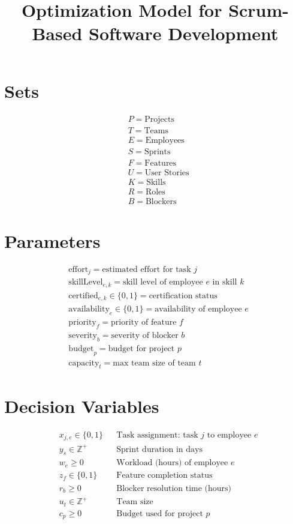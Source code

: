 \documentclass{article}
\begin{document}
\title{Optimization Model for Scrum-Based Software Development}
\author{}
\date{}
\maketitle

\section*{Sets}
\begin{align*}
& P = \text{Projects} \\
& T = \text{Teams} \\
& E = \text{Employees} \\
& S = \text{Sprints} \\
& F = \text{Features} \\
& U = \text{User Stories} \\
& K = \text{Skills} \\
& R = \text{Roles} \\
& B = \text{Blockers}
\end{align*}

\section*{Parameters}
\begin{align*}
& \text{effort}_j = \text{estimated effort for task } j \\
& \text{skillLevel}_{e,k} = \text{skill level of employee } e \text{ in skill } k \\
& \text{certified}_{e,k} \in \{0,1\} = \text{certification status} \\
& \text{availability}_e \in \{0,1\} = \text{availability of employee } e \\
& \text{priority}_f = \text{priority of feature } f \\
& \text{severity}_b = \text{severity of blocker } b \\
& \text{budget}_p = \text{budget for project } p \\
& \text{capacity}_t = \text{max team size of team } t
\end{align*}

\section*{Decision Variables}
\begin{align*}
& x_{j,e} \in \{0,1\} && \text{Task assignment: task } j \text{ to employee } e \\
& y_s \in \mathbb{Z}^+ && \text{Sprint duration in days} \\
& w_e \geq 0 && \text{Workload (hours) of employee } e \\
& z_f \in \{0,1\} && \text{Feature completion status} \\
& r_b \geq 0 && \text{Blocker resolution time (hours)} \\
& u_t \in \mathbb{Z}^+ && \text{Team size} \\
& c_p \geq 0 && \text{Budget used for project } p
\end{align*}
\end{document}

